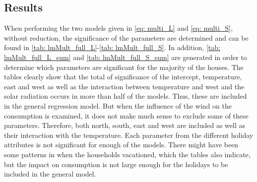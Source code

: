 

\subsection{Results}
When performing the two models given in \cref{eq: multi_L} and \cref{eq: multi_S}, without reduction, the significance of the parameters are determined and can be found in \cref{tab: lmMult_full_L}-\ref{tab: lmMult_full_S}. In addition, \cref{tab: lmMult_full_L_sum} and \cref{tab: lmMult_full_S_sum} are generated in order to determine which parameters are significant for the majority of the houses. The tables clearly show that the total of significance of the intercept, temperature, east and west as well as the interaction between temperature and west and the solar radiation occurs in more than half of the models. Thus, these are included in the general regression model. But when the influence of the wind on the consumption is examined, it does not make much sense to exclude some of these parameters. Therefore, both north, south, east and west are included as well as their interaction with the temperature. Each parameter from the different holiday attributes is not significant for enough of the models. There might have been some patterns in when the households vacationed, which the tables also indicate, but the impact on consumption is not large enough for the holidays to be included in the general model.
\begin{table}
    \centering
\caption{The distribution of significant parameters from the multiple linear regression model for long houses. There are 43 long houses, thus the total of the signifance of each parameter for each house is in relation to the number of long houses}
\label{tab: lmMult_full_L_sum}
\end{table}
